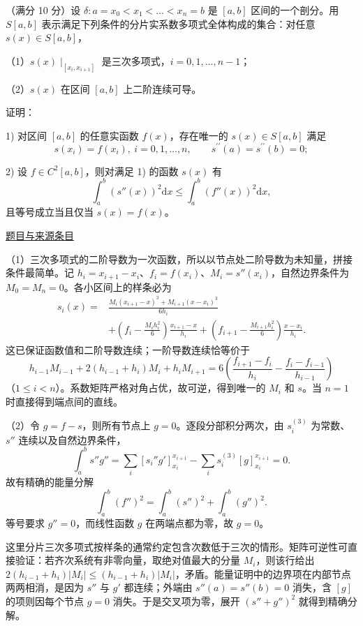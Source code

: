 \documentclass[12pt,fontset=fandol]{ctexart}
\begin{document}
\begin{example}\label{ex:fin10-hi:11}\label{pr:fin10-hi:11}

（满分 10 分）设 $\delta: a = x_0 < x_1 < \dots < x_n = b$ 是 $[a, b]$ 区间的一个剖分。用 $S[a, b]$ 表示满足下列条件的分片实系数多项式全体构成的集合：对任意 $s(x) \in S[a, b]$，

（1）$s(x) \mid_{[x_i, x_{i+1}]}$ 是三次多项式，$i = 0, 1, \dots, n-1$；

（2）$s(x)$ 在区间 $[a, b]$ 上二阶连续可导。

证明：

1) 对区间 $[a,b]$ 的任意实函数 $f(x)$，存在唯一的 $s(x)\in S[a,b]$ 满足
\[
s\left(x_{i}\right)=f\left(x_{i}\right),\ i=0,1,\dots,n, \qquad s^{\prime\prime}(a)=s^{\prime\prime}(b)=0;
\]

2) 设 $f\in C^{2}[a,b]$，则对满足 1) 的函数 $s(x)$ 有
\[
\int_{a}^{b}\left(s''(x)\right)^{2}\mathrm{d}x\leq \int_{a}^{b}\left(f''(x)\right)^{2}\mathrm{d}x,
\]
且等号成立当且仅当 $s(x)=f(x)$。

\par\href{https://github.com/lzxcr/cmc-mathematics/blob/64916fa1fdbc3e444a652eca204d5669058ee321/src/problems/finals/10/13.md}{题目与来源条目}

\end{example}

\begin{solve}\label{ans:fin10-hi:11}

（1）三次多项式的二阶导数为一次函数，所以以节点处二阶导数为未知量，拼接条件最简单。记 $h_i=x_{i+1}-x_i$、$f_i=f(x_i)$、$M_i=s''(x_i)$，自然边界条件为 $M_0=M_n=0$。各小区间上的样条必为
\[
\begin{aligned}
s_i(x)={}&\frac{M_i(x_{i+1}-x)^3+M_{i+1}(x-x_i)^3}{6h_i}\\
&+\left(f_i-\frac{M_ih_i^2}{6}\right)\frac{x_{i+1}-x}{h_i}
+\left(f_{i+1}-\frac{M_{i+1}h_i^2}{6}\right)\frac{x-x_i}{h_i}.
\end{aligned}
\]
这已保证函数值和二阶导数连续；一阶导数连续恰等价于
\[
h_{i-1}M_{i-1}+2(h_{i-1}+h_i)M_i+h_iM_{i+1}
=6\left(\frac{f_{i+1}-f_i}{h_i}-\frac{f_i-f_{i-1}}{h_{i-1}}\right)
\]
（$1\leq i<n$）。系数矩阵严格对角占优，故可逆，得到唯一的 $M_i$ 和 $s$。当 $n=1$ 时直接得到端点间的直线。

（2）令 $g=f-s$，则所有节点上 $g=0$。逐段分部积分两次，由 $s_i^{(3)}$ 为常数、$s''$ 连续以及自然边界条件，
\[
\int_a^bs''g''=\sum_i[s_i''g']_{x_i}^{x_{i+1}}
-\sum_i s_i^{(3)}[g]_{x_i}^{x_{i+1}}=0.
\]
故有精确的能量分解
\[
\int_a^b(f'')^2=\int_a^b(s'')^2+\int_a^b(g'')^2.
\]
等号要求 $g''=0$，而线性函数 $g$ 在两端点都为零，故 $g=0$。

这里分片三次多项式按样条的通常约定包含次数低于三次的情形。矩阵可逆性可直接验证：若齐次系统有非零向量，取绝对值最大的分量 $M_i$，则该行给出 $2(h_{i-1}+h_i)|M_i|\le(h_{i-1}+h_i)|M_i|$，矛盾。能量证明中的边界项在内部节点两两相消，是因为 $s''$ 与 $g'$ 都连续；外端由 $s''(a)=s''(b)=0$ 消失，含 $[g]$ 的项则因每个节点 $g=0$ 消失。于是交叉项为零，展开 $(s''+g'')^2$ 就得到精确分解。

\end{solve}
\end{document}
